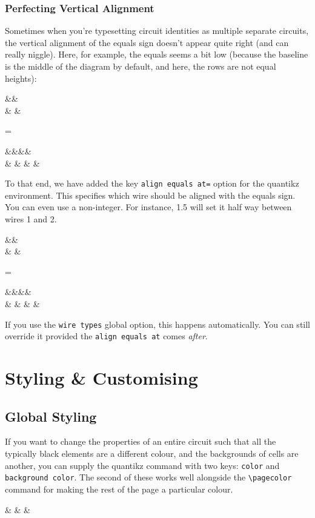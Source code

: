 \documentclass[aps,pra,10pt,nofootinbib]{revtex4-2}
\begin{document}
\subsubsection{Perfecting Vertical Alignment}

Sometimes when you're typesetting circuit identities as multiple separate circuits, the vertical alignment of the equals sign doesn't appear quite right (and can really niggle). Here, for example, the equals seems a bit low (because the baseline is the middle of the diagram by default, and here, the rows are not equal heights):
\begin{Code}
  \begin{quantikz}
    && \\
    &  &
  \end{quantikz}=\begin{quantikz}
    &&&& \\
    &  &  &  &
  \end{quantikz}
\end{Code}
To that end, we have added the key \texttt{align equals at=} option for the quantikz environment. This specifies which wire should be aligned with the equals sign. You can even use a non-integer. For instance, 1.5 will set it half way between wires 1 and 2.
\begin{Code}
  \begin{quantikz}[align equals at=1.5]
    && \\
    &  &
  \end{quantikz}=\begin{quantikz}[align equals at=1.5]
    &&&& \\
    &  &  &  &
  \end{quantikz}
\end{Code}
If you use the \texttt{wire types} global option, this happens automatically. You can still override it provided the \texttt{align equals at} comes \emph{after}.

\section{Styling \& Customising}\label{sec:style}

\subsection{Global Styling}

If you want to change the properties of an entire circuit such that all the typically black elements are a different colour, and the backgrounds of cells are another, you can supply the quantikz command with two keys: \verb!color! and \verb!background color!. The second of these works well alongside the \verb!\pagecolor! command for making the rest of the page a particular colour.
\begin{Code}
  \begin{quantikz}[color=blue,background color=yellow]
    \lstick{\ket{\psi}} &  &  & \meter{}
  \end{quantikz}
\end{Code}
\end{document}
